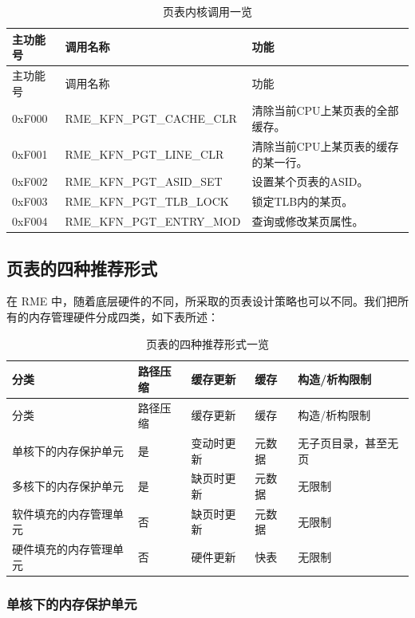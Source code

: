\begin{xltabular}{\textwidth}{@{}>{\hsize\raggedright\arraybackslash}X>{\hsize\raggedright\arraybackslash}X>{\hsize\raggedright\arraybackslash}X@{}}
\caption{页表内核调用一览}\label{tab:8-1-page-table-kernel-calls}\\
\toprule
主功能号 & 调用名称 & 功能\tabularnewline
\endfirsthead
\toprule
主功能号 & 调用名称 & 功能\tabularnewline
\midrule
\endhead
\bottomrule
\endlastfoot
0xF000 & RME\_KFN\_PGT\_CACHE\_CLR &
清除当前CPU上某页表的全部缓存。\tabularnewline
0xF001 & RME\_KFN\_PGT\_LINE\_CLR &
清除当前CPU上某页表的缓存的某一行。\tabularnewline
0xF002 & RME\_KFN\_PGT\_ASID\_SET & 设置某个页表的ASID。\tabularnewline
0xF003 & RME\_KFN\_PGT\_TLB\_LOCK & 锁定TLB内的某页。\tabularnewline
0xF004 & RME\_KFN\_PGT\_ENTRY\_MOD & 查询或修改某页属性。\tabularnewline
\end{xltabular}

\subsection{页表的四种推荐形式}\label{subsec:8-four-recommended-page-table-forms}
\nopagebreak[4]

在 RME 中，随着底层硬件的不同，所采取的页表设计策略也可以不同。我们把所有的内存管理硬件分成四类，如下表所述：

\begin{xltabular}{\textwidth}{@{}>{\hsize\raggedright\arraybackslash}X>{\hsize\raggedright\arraybackslash}X>{\hsize\raggedright\arraybackslash}X>{\hsize\raggedright\arraybackslash}X>{\hsize\raggedright\arraybackslash}X@{}}
\caption{页表的四种推荐形式一览}\label{tab:8-2-four-recommended-page-table-forms}\\
\toprule
分类 & 路径压缩 & 缓存更新 & 缓存 & 构造/析构限制\tabularnewline
\endfirsthead
\toprule
分类 & 路径压缩 & 缓存更新 & 缓存 & 构造/析构限制\tabularnewline
\midrule
\endhead
\bottomrule
\endlastfoot
单核下的内存保护单元 & 是 & 变动时更新 & 元数据 &
无子页目录，甚至无页\tabularnewline
多核下的内存保护单元 & 是 & 缺页时更新 & 元数据 & 无限制\tabularnewline
软件填充的内存管理单元 & 否 & 缺页时更新 & 元数据 &
无限制\tabularnewline
硬件填充的内存管理单元 & 否 & 硬件更新 & 快表 & 无限制\tabularnewline
\end{xltabular}

\subsubsection{单核下的内存保护单元}\label{subsubsec:8-single-core-mpu}

